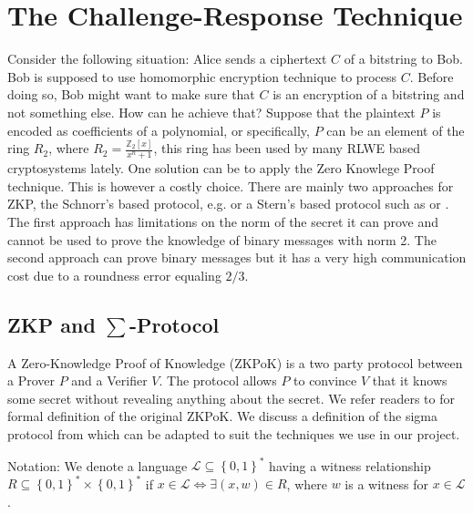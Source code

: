 \section{The Challenge-Response Technique}
\label{sec:6challenge}
Consider the following situation:  Alice sends a ciphertext \(C\) of a bitstring to
Bob. Bob is supposed to use homomorphic encryption technique to process
\(C\). Before doing so, Bob might want to make sure that \(C\) is an encryption
of a bitstring and not something else. How can he achieve that? Suppose that the
plaintext \(P\) is encoded as coefficients of a polynomial, or specifically,
\(P\) can be an element of the ring \(R_{2}\), where
\(R_{2} = \frac{\mathbb{Z}_{2}[x]}{x^{n} + 1}\), this ring has been used by many RLWE
based cryptosystems lately. One solution can be to apply the Zero Knowlege Proof
technique. This is however a costly choice. There are mainly two approaches
for ZKP, the Schnorr's based protocol, e.g. \cite{benhamouda2014better} or
a Stern's based protocol such as \cite{stern1993new} or
\cite{ling2013improved}. The first approach has limitations on the norm of the
secret it can prove and cannot be used to prove the knowledge of binary messages
with norm 2. The second approach can prove binary messages but it has a very high
communication cost due to a roundness error equaling \(2/3\).
\subsection{ZKP and $\sum$-Protocol}
\label{sub:zkp_and_sum_protocol}
A Zero-Knowledge Proof of Knowledge (ZKPoK) is a two party protocol between a
Prover $P$ and a Verifier $V$. The protocol allows $P$ to convince $V$ that it
knows some secret without revealing anything about the secret. We refer readers
to \cite{bellare1992defining} for formal definition of the original ZKPoK. We
discuss a definition of the sigma protocol from \cite{benhamouda2014better} which can be adapted to suit the techniques we use in our project.

Notation: We denote a language $\mathcal{L} \subseteq \left\{ 0,1 \right\}^* $
having a witness relationship $R \subseteq \left\{ 0,1 \right\}^* \times \left\{
  0,1 \right\}^*$ if $x \in \mathcal{L} \iff \exists (x,w) \in R$, where
$w$ is a witness for $x \in \mathcal{L}$.

